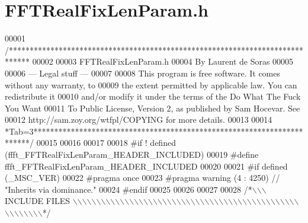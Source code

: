 \hypertarget{a00099_source}{\section{F\+F\+T\+Real\+Fix\+Len\+Param.\+h}
\label{a00099_source}
}

\begin{DoxyCode}
00001 \textcolor{comment}{/*****************************************************************************}
00002 \textcolor{comment}{}
00003 \textcolor{comment}{        FFTRealFixLenParam.h}
00004 \textcolor{comment}{        By Laurent de Soras}
00005 \textcolor{comment}{}
00006 \textcolor{comment}{--- Legal stuff ---}
00007 \textcolor{comment}{}
00008 \textcolor{comment}{This program is free software. It comes without any warranty, to}
00009 \textcolor{comment}{the extent permitted by applicable law. You can redistribute it}
00010 \textcolor{comment}{and/or modify it under the terms of the Do What The Fuck You Want}
00011 \textcolor{comment}{To Public License, Version 2, as published by Sam Hocevar. See}
00012 \textcolor{comment}{http://sam.zoy.org/wtfpl/COPYING for more details.}
00013 \textcolor{comment}{}
00014 \textcolor{comment}{*Tab=3***********************************************************************/}
00015 
00016 
00017 
00018 \textcolor{preprocessor}{#if ! defined (ffft\_FFTRealFixLenParam\_HEADER\_INCLUDED)}
00019 \textcolor{preprocessor}{#define ffft\_FFTRealFixLenParam\_HEADER\_INCLUDED}
00020 
00021 \textcolor{preprocessor}{#if defined (\_MSC\_VER)}
00022 \textcolor{preprocessor}{    #pragma once}
00023 \textcolor{preprocessor}{    #pragma warning (4 : 4250) // "Inherits via dominance."}
00024 \textcolor{preprocessor}{#endif}
00025 
00026 
00027 
00028 \textcolor{comment}{/*\(\backslash\)\(\backslash\)\(\backslash\) INCLUDE FILES \(\backslash\)\(\backslash\)\(\backslash\)\(\backslash\)\(\backslash\)\(\backslash\)\(\backslash\)\(\backslash\)\(\backslash\)\(\backslash\)\(\backslash\)\(\backslash\)\(\backslash\)\(\backslash\)\(\backslash\)\(\backslash\)\(\backslash\)\(\backslash\)\(\backslash\)\(\backslash\)\(\backslash\)\(\backslash\)\(\backslash\)\(\backslash\)\(\backslash\)\(\backslash\)\(\backslash\)\(\backslash\)\(\backslash\)\(\backslash\)\(\backslash\)\(\backslash\)\(\backslash\)\(\backslash\)\(\backslash\)\(\backslash\)\(\backslash\)\(\backslash\)\(\backslash\)\(\backslash\)\(\backslash\)\(\backslash\)\(\backslash\)\(\backslash\)\(\backslash\)\(\backslash\)\(\backslash\)\(\backslash\)\(\backslash\)\(\backslash\)\(\backslash\)\(\backslash\)\(\backslash\)\(\backslash\)\(\backslash\)\(\backslash\)*/}

\end{DoxyCode}
